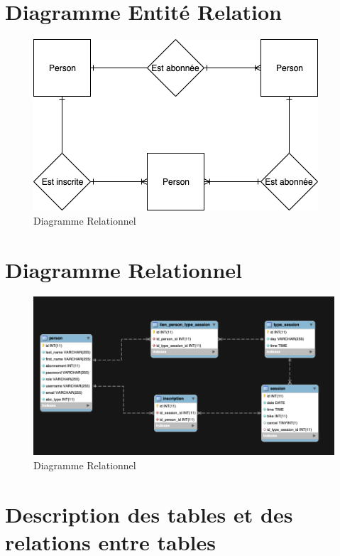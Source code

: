 \section{Diagramme Entité Relation}
	\begin{figure}[h!]
       	\includegraphics[width=0.8\linewidth, center]{Figures/Entite-relation.png}
       	\caption{Diagramme Relationnel}
	\end{figure}

\newpage
\section{Diagramme Relationnel}
	\begin{figure}[h!]
       	\includegraphics[width=\linewidth, center]{Figures/Diagramme-Relationnel}
       	 \caption{Diagramme Relationnel}
	\end{figure}
	
	
\section{Description des tables et des relations entre tables}
